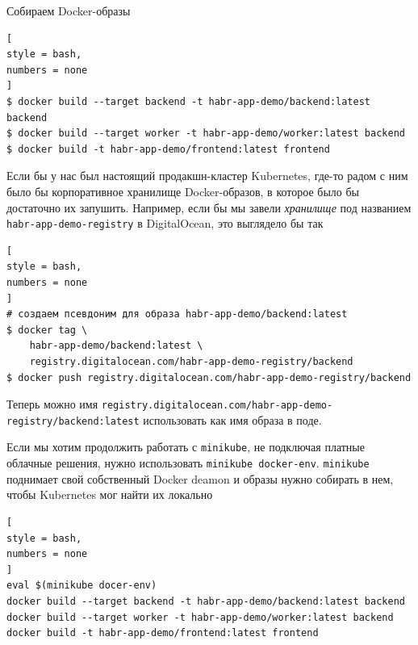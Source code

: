 \documentclass[%
	11pt,
	a4paper,
	utf8,
		]{article}
\begin{document}
Собираем Docker-образы
\begin{lstlisting}[
style = bash,
numbers = none
]
$ docker build --target backend -t habr-app-demo/backend:latest backend
$ docker build --target worker -t habr-app-demo/worker:latest backend
$ docker build -t habr-app-demo/frontend:latest frontend
\end{lstlisting}

Если бы у нас был настоящий продакшн-кластер Kubernetes, где-то радом с ним было бы корпоративное хранилище Docker-образов, в которое было бы достаточно их запушить. Например, если бы мы завели \emph{хранилище} под названием \verb*|habr-app-demo-registry| в DigitalOcean, это выглядело бы так
\begin{lstlisting}[
style = bash,
numbers = none
]
# создаем псевдоним для образа habr-app-demo/backend:latest
$ docker tag \
    habr-app-demo/backend:latest \
    registry.digitalocean.com/habr-app-demo-registry/backend
$ docker push registry.digitalocean.com/habr-app-demo-registry/backend
\end{lstlisting}

Теперь можно имя \verb*|registry.digitalocean.com/habr-app-demo-registry/backend:latest| использовать как имя образа в поде.

Если мы хотим продолжить работать с \verb*|minikube|, не подключая платные облачные решения, нужно использовать \verb|minikube docker-env|. \verb*|minikube| поднимает свой собственный Docker deamon и образы нужно собирать в нем, чтобы Kubernetes мог найти их локально
\begin{lstlisting}[
style = bash,
numbers = none
]
eval $(minikube docer-env)
docker build --target backend -t habr-app-demo/backend:latest backend
docker build --target worker -t habr-app-demo/worker:latest backend
docker build -t habr-app-demo/frontend:latest frontend
\end{lstlisting}
\end{document}
